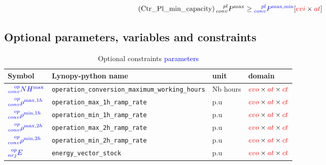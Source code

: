 \documentclass[a4paper,11pt]{article}
\begin{document}
\begin{equation} \tag{Ctr\_Pl\_min\_capacity}
   \prescript{pl}{conv}{P^{\max}}  \geq  \textcolor{blue}{ \prescript{pl}{conv}{P}^{\max,\min}} \hfill [\textcolor{red}{evi}  \times \textcolor{red}{at}]
\label{eq:Ctr_Pl_planning_min_capacity}
\end{equation}

\newpage
\subsection{Optional parameters, variables and constraints}

\begin{table}[h]
\footnotesize
\centering
\caption{Optional constraints \textcolor{blue}{parameters}}
\begin{tabular}{llll}
\hline
    \textbf{Symbol} & \textbf{Lynopy-python name} & \textbf{unit}  & \textbf{domain} \\ \hline
    
    $\textcolor{blue}{\prescript{op}{conv}{NH^{\max}}}$&      \verb|operation_conversion_maximum_working_hours| & Nb hours & $\textcolor{red}{evo}  \times \textcolor{red}{at} \times \textcolor{red}{ct} $ \\ 
    
    $\textcolor{blue}{\prescript{op}{conv}{\rho^{\max,1h}}}$&  \verb|operation_max_1h_ramp_rate| & p.u & $\textcolor{red}{evo}  \times \textcolor{red}{at} \times \textcolor{red}{ct} $  \\ 
    
    $\textcolor{blue}{\prescript{op}{conv}{\rho^{\min,1h}}}$&  \verb|operation_min_1h_ramp_rate| & p.u & $\textcolor{red}{evo}  \times \textcolor{red}{at} \times \textcolor{red}{ct} $  \\ 
    
    $\textcolor{blue}{\prescript{op}{conv}{\rho^{\max,2h}}}$&  \verb|operation_max_2h_ramp_rate| & p.u & $\textcolor{red}{evo}  \times \textcolor{red}{at} \times \textcolor{red}{ct} $  \\ 
    
    $\textcolor{blue}{\prescript{op}{conv}{\rho^{\min,2h}}}$&  \verb|operation_min_2h_ramp_rate| & p.u & $\textcolor{red}{evo}  \times \textcolor{red}{at} \times \textcolor{red}{ct} $   \\ \hline
    
    $\textcolor{blue}{\prescript{op}{nrj}{E}}$ &  \verb|energy_vector_stock| & p.u & $\textcolor{red}{evo}  \times \textcolor{red}{at} \times \textcolor{red}{ct} $   \\ \hline
    
  \end{tabular}
\end{table}
\end{document}
